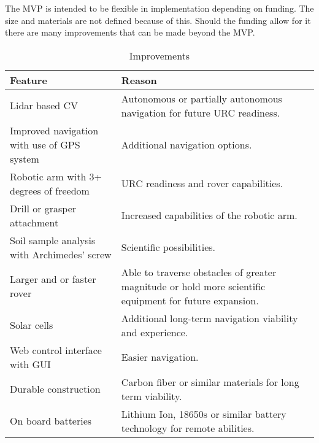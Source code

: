 \documentclass[conference]{IEEEtran} %
\begin{document}
  The MVP is intended to be flexible in implementation depending on funding. The size and materials are not defined because of this. Should the funding allow for it there are many improvements that can be made beyond the MVP. 

\begin{table}[hb!]
    \caption{Improvements}
    \centering

    \begin{tabularx}{\linewidth}{|L|L|} 
    \hline
    Feature & Reason \\
    \midrule
    Lidar based CV & Autonomous or partially autonomous navigation for future URC readiness. \\
    \hline
    Improved navigation with use of GPS system & Additional navigation options. \\
    \hline
    Robotic arm with 3+ degrees of freedom & URC readiness and rover capabilities. \\ 
    \hline
    Drill or grasper attachment & Increased capabilities of the robotic arm. \\
    \hline
    Soil sample analysis with Archimedes' screw & Scientific possibilities. \\
    \hline
    Larger and or faster rover & Able to traverse obstacles of greater magnitude or hold more scientific equipment for future expansion. \\
    \hline
    Solar cells & Additional long-term navigation viability and experience. \\
    \hline
    Web control interface with GUI & Easier navigation. \\
    \hline
    Durable construction & Carbon fiber or similar materials for long term viability. \\
    \hline
    On board batteries & Lithium Ion, 18650s or similar battery technology for remote abilities. \\
    \hline
    \end{tabularx}
\label{tab:mvp-two}
\end{table}
\end{document}
